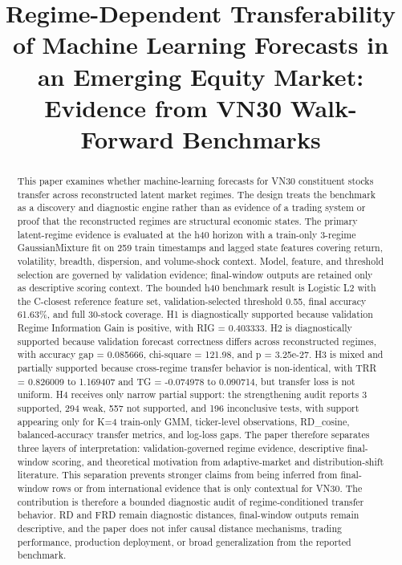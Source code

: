 \documentclass[12pt,a4paper]{article}
\title{Regime-Dependent Transferability of Machine Learning Forecasts in an Emerging Equity Market: Evidence from VN30 Walk-Forward Benchmarks}
\author{}
\date{}
\begin{document}
\maketitle

\begin{abstract}
This paper examines whether machine-learning forecasts for VN30 constituent stocks transfer across reconstructed latent market regimes. The design treats the benchmark as a discovery and diagnostic engine rather than as evidence of a trading system or proof that the reconstructed regimes are structural economic states. The primary latent-regime evidence is evaluated at the h40 horizon with a train-only 3-regime GaussianMixture fit on 259 train timestamps and lagged state features covering return, volatility, breadth, dispersion, and volume-shock context. Model, feature, and threshold selection are governed by validation evidence; final-window outputs are retained only as descriptive scoring context. The bounded h40 benchmark result is Logistic L2 with the C-closest reference feature set, validation-selected threshold 0.55, final accuracy 61.63\%, and full 30-stock coverage. H1 is diagnostically supported because validation Regime Information Gain is positive, with RIG = 0.403333. H2 is diagnostically supported because validation forecast correctness differs across reconstructed regimes, with accuracy gap = 0.085666, chi-square = 121.98, and p = 3.25e-27. H3 is mixed and partially supported because cross-regime transfer behavior is non-identical, with TRR = 0.826009 to 1.169407 and TG = -0.074978 to 0.090714, but transfer loss is not uniform. H4 receives only narrow partial support: the strengthening audit reports 3 supported, 294 weak, 557 not supported, and 196 inconclusive tests, with support appearing only for K=4 train-only GMM, ticker-level observations, RD\_cosine, balanced-accuracy transfer metrics, and log-loss gaps. The paper therefore separates three layers of interpretation: validation-governed regime evidence, descriptive final-window scoring, and theoretical motivation from adaptive-market and distribution-shift literature. This separation prevents stronger claims from being inferred from final-window rows or from international evidence that is only contextual for VN30. The contribution is therefore a bounded diagnostic audit of regime-conditioned transfer behavior. RD and FRD remain diagnostic distances, final-window outputs remain descriptive, and the paper does not infer causal distance mechanisms, trading performance, production deployment, or broad generalization from the reported benchmark.
\end{abstract}
\end{document}
